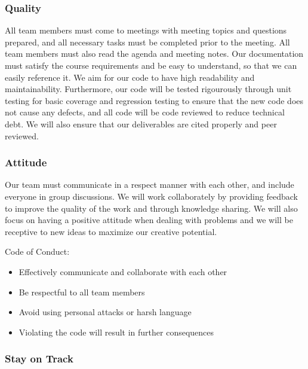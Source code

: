 \documentclass{article}
\begin{document}
\subsubsection*{Quality} 

All team members must come to meetings with meeting topics and questions prepared, and all necessary tasks must be completed prior to the meeting. All team members must also read the agenda and meeting notes. 
Our documentation must satisfy the course requirements and be easy to understand, so that we can easily reference it. We aim for our code to have high readability and maintainability. Furthermore, our code 
will be tested rigourously through unit testing for basic coverage and regression testing to ensure that the new code does not cause any defects, and all code will be code reviewed to reduce technical debt.
We will also ensure that our deliverables are cited properly and peer reviewed.

\subsubsection*{Attitude}

Our team must communicate in a respect manner with each other, and include everyone in group discussions. We will work collaborately by providing feedback to improve the quality of the work and through 
knowledge sharing. We will also focus on having a positive attitude when dealing with problems and we will be receptive to new ideas to maximize our creative potential.


Code of Conduct: 
\begin{itemize}
    \item Effectively communicate and collaborate with each other
    \item Be respectful to all team members
    \item Avoid using personal attacks or harsh language
    \item Violating the code will result in further consequences
\end{itemize}

\subsubsection*{Stay on Track}
\end{document}
